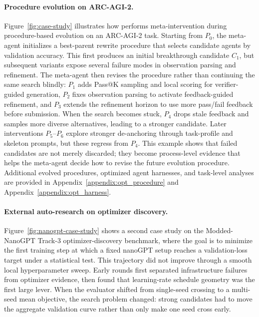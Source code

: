 \paragraph{Procedure evolution on ARC-AGI-2.}
Figure~\ref{fig:case-study} illustrates how \ourmethod performs meta-intervention during procedure-based evolution on an ARC-AGI-2 task.
Starting from $P_0$, the meta-agent initializes a best-parent rewrite procedure that selects candidate agents by validation accuracy.
This first produces an initial breakthrough candidate $C_1$, but subsequent variants expose several failure modes in observation parsing and refinement.
The meta-agent then revises the procedure rather than continuing the same search blindly: $P_1$ adds Pass@K sampling and local scoring for verifier-guided generation, $P_2$ fixes observation parsing to activate feedback-guided refinement, and $P_3$ extends the refinement horizon to use more pass/fail feedback before submission.
When the search becomes stuck, $P_4$ drops stale feedback and samples more diverse alternatives, leading to a stronger candidate.
Later interventions $P_{5}$--$P_{6}$ explore stronger de-anchoring through task-profile and skeleton prompts, but these regress from $P_4$.
This example shows that failed candidates are not merely discarded; they become process-level evidence that helps the meta-agent decide how to revise the future evolution procedure.
Additional evolved procedures, optimized agent harnesses, and task-level analyses are provided in Appendix~\ref{appendix:opt_procedure} and Appendix~\ref{appendix:opt_harness}.

\paragraph{External auto-research on optimizer discovery.}
Figure~\ref{fig:nanogpt-case-study} shows a second case study on the Modded-NanoGPT Track-3 optimizer-discovery benchmark, where the goal is to minimize the first training step at which a fixed nanoGPT setup reaches a validation-loss target under a statistical test.
This trajectory did not improve through a smooth local hyperparameter sweep.
Early rounds first separated infrastructure failures from optimizer evidence, then found that learning-rate schedule geometry was the first large lever.
When the evaluator shifted from single-seed crossing to a multi-seed mean objective, the search problem changed: strong candidates had to move the aggregate validation curve rather than only make one seed cross early.

